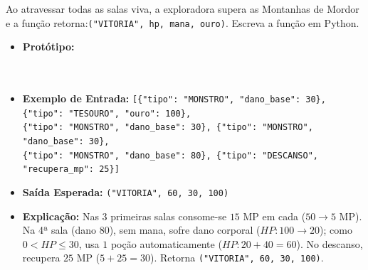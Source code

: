 \begin{enumerate}[label=\textbf{Q\arabic*.}, start=11]
Ao atravessar todas as salas viva, a exploradora supera as Montanhas de Mordor e a função retorna:\newline \texttt{("VITORIA", hp, mana, ouro)}. Escreva a função  em Python.

\begin{itemize}[leftmargin=*, noitemsep, topsep=1pt]
    \item \textbf{Protótipo:}\newline
    \\\\\\
    \item \textbf{Exemplo de Entrada:}\newline
    \texttt{[\{"tipo": "MONSTRO", "dano\_base": 30\}, \{"tipo": "TESOURO", "ouro": 100\},}\\\texttt{\phantom{[}\{"tipo": "MONSTRO", "dano\_base": 30\}, \{"tipo": "MONSTRO", "dano\_base": 30\},}\\\texttt{\phantom{[}\{"tipo": "MONSTRO", "dano\_base": 80\}, \{"tipo": "DESCANSO", "recupera\_mp": 25\}]}
    \item \textbf{Saída Esperada:} \texttt{("VITORIA", 60, 30, 100)}
    \item \textbf{Explicação:} Nas 3 primeiras salas consome-se $15$ MP em cada ($50 \to 5$ MP). Na 4ª sala (dano $80$), sem mana, sofre dano corporal ($HP: 100 \to 20$); como $0 < HP \le 30$, usa $1$ poção automaticamente ($HP: 20 + 40 = 60$). No descanso, recupera $25$ MP ($5 + 25 = 30$). Retorna \texttt{("VITORIA", 60, 30, 100)}.
\end{itemize}



\end{enumerate}




